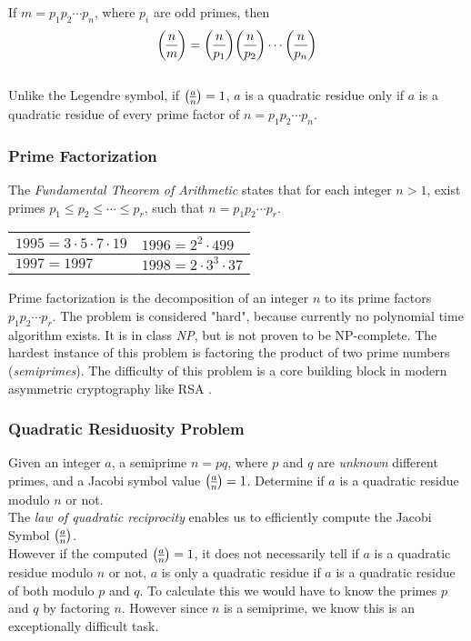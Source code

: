 If $m = p_1p_2 \cdots p_n$, where $p_i$ are odd primes, then
$$\dlegendre{n}{m} = \dlegendre{n}{p_1}\dlegendre{n}{p_2} \cdots\dlegendre{n}{p_n}$$
\\
Unlike the Legendre symbol, if $\legendre{a}{n} = 1$, $a$ is a quadratic residue only if $a$ is a quadratic residue of every prime factor of $n=p_1p_2 \cdots p_n$.

\subsubsection{Prime Factorization}
\cite{andrews1994number} The \textit{Fundamental Theorem of Arithmetic} states that for each integer \newline $n > 1$, exist primes $p_1 \le p_2 \le \cdots \le p_r$, such that $n = p_1 p_2 \cdots p_r$.

\begin{center}
	\begin{tabular}{|l|l|}
		\hline
		$1995 = 3 \cdot 5 \cdot 7 \cdot 19$ & 
		$1996 = 2^2 \cdot 499$ \\
		\hline
		$1997 = 1997$ &
		$1998 = 2 \cdot 3^3 \cdot 37$\\
		\hline
	\end{tabular}
\end{center}


Prime factorization is the decomposition of an integer $n$ to its prime factors $p_1 p_2 \cdots p_r$.
The problem is considered "hard", because currently no polynomial time algorithm exists. It is in class \textit{NP}, but is not proven to be NP-complete.
The hardest instance of this problem is factoring the product of two prime numbers (\textit{semiprimes}).
The difficulty of this problem is a core building block in modern asymmetric cryptography like RSA \cite{rivest1978method}.

\subsubsection{Quadratic Residuosity Problem}
Given an integer $a$, a semiprime $n = pq$, where $p$ and $q$ are \textit{unknown} different primes, and a Jacobi symbol value $\legendre{a}{n} = 1$.
Determine if $a$ is a quadratic residue modulo $n$ or not.
\bigskip\\
The \textit{law of quadratic reciprocity} enables us to efficiently compute the Jacobi Symbol $\legendre{a}{n}$.\\
However if the computed $\legendre{a}{n} = 1$, it does not necessarily tell if $a$ is a quadratic residue modulo $n$ or not, $a$ is only a quadratic residue if $a$ is a quadratic residue of both modulo $p$ and $q$.
To calculate this we would have to know the primes $p$ and $q$ by factoring $n$. However since $n$ is a semiprime, we know this is an exceptionally  difficult task.

